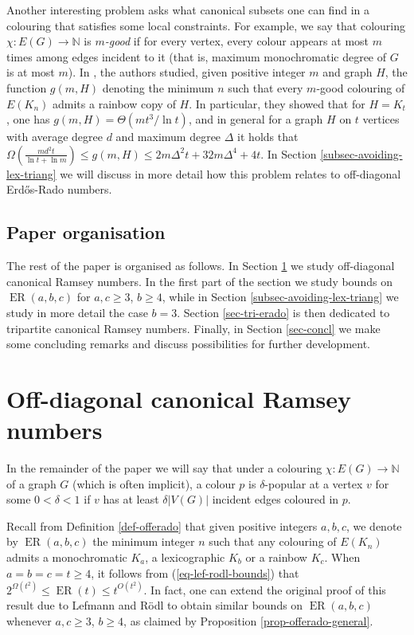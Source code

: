 \documentclass[10pt,a4paper]{article}
\theoremstyle{plain}
\theoremstyle{definition}
\newcommand{\N}{\mathbb{N}}
\newcommand{\eradograph}[1]{\operatorname{ER}(#1)}
\newcommand{\offerado}[3]{\operatorname{ER}(#1,#2,#3)}
\begin{document}
Another interesting problem asks what canonical subsets one can find in a colouring that satisfies some local constraints. For example, we say that colouring $\chi:E(G)\to\N$ is \emph{$m$-good} if for every vertex, every colour appears at most $m$ times among edges incident to it (that is, maximum monochromatic degree of $G$ is at most $m$). In \cite{alon2003properly}, the authors studied, given positive integer $m$ and graph $H$, the function $g(m,H)$ denoting the minimum $n$ such that every $m$-good colouring of $E(K_n)$ admits a rainbow copy of $H$. In particular, they showed that for $H=K_t$, one has $g(m,H)=\Theta(mt^3/\ln t)$, and in general for a graph $H$ on $t$ vertices with average degree $d$ and maximum degree $\Delta$ it holds that $\Omega(\frac{md^2t}{\ln t+\ln m})\le g(m,H)\le 2m\Delta^2t+32m\Delta^4+4t$. In Section \ref{subsec-avoiding-lex-triang} we will discuss in more detail how this problem relates to off-diagonal Erd\H{o}s-Rado numbers.

\subsection{Paper organisation}\label{subsec-paper-org}

The rest of the paper is organised as follows. In Section \ref{sec-offerado} we study off-diagonal canonical Ramsey numbers. In the first part of the section we study bounds on $\offerado{a}{b}{c}$ for $a,c\ge 3$, $b\ge 4$, while in Section \ref{subsec-avoiding-lex-triang} we study in more detail the case $b=3$. Section \ref{sec-tri-erado} is then dedicated to tripartite canonical Ramsey numbers. Finally, in Section \ref{sec-concl} we make some concluding remarks and discuss possibilities for further development.


\section{Off-diagonal canonical Ramsey numbers}\label{sec-offerado}

In the remainder of the paper we will say that under a colouring $\chi:E(G)\to\N$ of a graph $G$ (which is often implicit), a colour $p$ is $\delta$-popular at a vertex $v$ for some $0<\delta<1$ if $v$ has at least $\delta|V(G)|$ incident edges coloured in $p$.

Recall from Definition \ref{def-offerado} that given positive integers $a,b,c$, we denote by $\offerado{a}{b}{c}$ the minimum integer $n$ such that any colouring of $E(K_n)$ admits a monochromatic $K_a$, a lexicographic $K_b$ or a rainbow $K_c$. When $a=b=c=t\ge 4$, it follows from (\ref{eq-lef-rodl-bounds}) that $2^{\Omega(t^2)}\le\eradograph{t}\le t^{O(t^2)}$. In fact, one can extend the original proof of this result due to Lefmann and R\"odl \cite{lefmann1995erdHos} to obtain similar bounds on $\offerado{a}{b}{c}$ whenever $a,c\ge3$, $b\ge4$, as claimed by Proposition \ref{prop-offerado-general}.
\end{document}
